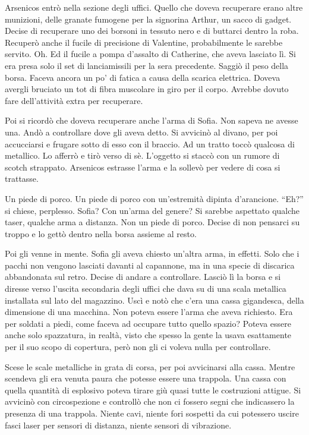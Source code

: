     Arsenicos entrò nella sezione degli uffici. Quello che doveva recuperare erano altre munizioni, delle granate
    fumogene per la signorina Arthur, un sacco di gadget. Decise di recuperare uno dei borsoni in tessuto nero e di
    buttarci dentro la roba. Recuperò anche il fucile di precisione di Valentine, probabilmente le sarebbe servito. Oh.
    Ed il fucile a pompa d'assalto di Catherine, che aveva lasciato lì. Si era presa solo il set di lanciamissili per
    la sera precedente. Saggiò il peso della borsa. Faceva ancora un po' di fatica a causa della scarica elettrica.
    Doveva avergli bruciato un tot di fibra muscolare in giro per il corpo. Avrebbe dovuto fare dell'attività extra per
    recuperare.

    Poi si ricordò che doveva recuperare anche l'arma di Sofia. Non sapeva ne avesse una. Andò a controllare dove gli
    aveva detto. Si avvicinò al divano, per poi accucciarsi e frugare sotto di esso con il braccio. Ad un tratto toccò
    qualcosa di metallico. Lo afferrò e tirò verso di sè. L'oggetto si staccò con un rumore di scotch strappato.
    Arsenicos estrasse l'arma e la sollevò per vedere di cosa si trattasse.

    Un piede di porco. Un piede di porco con un'estremità dipinta d'arancione. ``Eh?'' si chiese, perplesso. Sofia? Con
    un'arma del genere? Si sarebbe aspettato qualche taser, qualche arma a distanza. Non un piede di porco. Decise di
    non pensarci su troppo e lo gettò dentro nella borsa assieme al resto.

    Poi gli venne in mente. Sofia gli aveva chiesto un'altra arma, in effetti. Solo che i pacchi non vengono lasciati
    davanti al capannone, ma in una specie di discarica abbandonata sul retro. Decise di andare a controllare. Lasciò lì
    la borsa e si diresse verso l'uscita secondaria degli uffici che dava su di una scala metallica installata sul lato
    del magazzino. Uscì e notò che c'era una cassa gigandesca, della dimensione di una macchina. Non poteva essere
    l'arma che aveva richiesto. Era per soldati a piedi, come faceva ad occupare tutto quello spazio? Poteva essere anche
    solo spazzatura, in realtà, visto che spesso la gente la usava esattamente per il suo scopo di copertura, però non
    gli ci voleva nulla per controllare.

    Scese le scale metalliche in grata di corsa, per poi avvicinarsi alla cassa. Mentre scendeva gli era venuta paura
    che potesse essere una trappola. Una cassa con quella quantità di esplosivo poteva tirare giù quasi tutte le
    costruzioni attigue. Si avvicinò con circospezione e controllò che non ci fossero segni che indicassero la presenza
    di una trappola. Niente cavi, niente fori sospetti da cui potessero uscire fasci laser per sensori di distanza,
    niente sensori di vibrazione.

